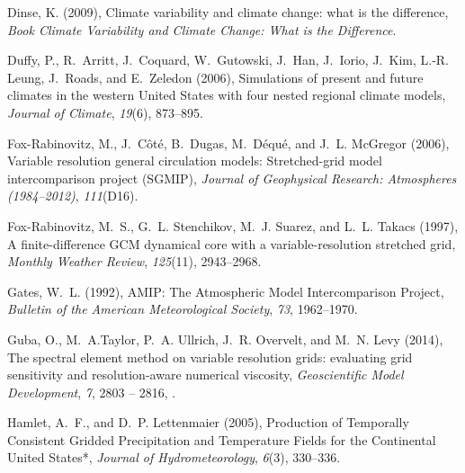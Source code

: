 \documentclass[draft,ms]{agutex}   %
\begin{document}
\begin{article}
\begin{thebibliography}{72}
Dinse, K. (2009), Climate variability and climate change: what is the
  difference, \textit{Book Climate Variability and Climate Change: What is the
  Difference}.

Duffy, P., R.~Arritt, J.~Coquard, W.~Gutowski, J.~Han, J.~Iorio, J.~Kim, L.-R.
  Leung, J.~Roads, and E.~Zeledon (2006), {Simulations of present and future
  climates in the western United States with four nested regional climate
  models}, \textit{Journal of Climate}, \textit{19}(6), 873--895.

Fox-Rabinovitz, M., J.~C{\^o}t{\'e}, B.~Dugas, M.~D{\'e}qu{\'e}, and J.~L.
  McGregor (2006), {Variable resolution general circulation models:
  Stretched-grid model intercomparison project (SGMIP)}, \textit{Journal of
  Geophysical Research: Atmospheres (1984--2012)}, \textit{111}(D16).

Fox-Rabinovitz, M.~S., G.~L. Stenchikov, M.~J. Suarez, and L.~L. Takacs (1997),
  {A finite-difference GCM dynamical core with a variable-resolution stretched
  grid}, \textit{Monthly Weather Review}, \textit{125}(11), 2943--2968.

{Gates}, W.~L. (1992), {AMIP: The Atmospheric Model Intercomparison Project},
  \textit{Bulletin of the American Meteorological Society}, \textit{73},
  1962--1970.

Guba, O., M.~A.Taylor, P.~A. Ullrich, J.~R. Overvelt, and M.~N. Levy (2014),
  The spectral element method on variable resolution grids: evaluating grid
  sensitivity and resolution-aware numerical viscosity, \textit{Geoscientific
  Model Development}, \textit{7}, 2803 -- 2816, .

Hamlet, A.~F., and D.~P. Lettenmaier (2005), {Production of Temporally
  Consistent Gridded Precipitation and Temperature Fields for the Continental
  United States*}, \textit{Journal of Hydrometeorology}, \textit{6}(3),
  330--336.


\end{thebibliography}
\end{article}
\end{document}
